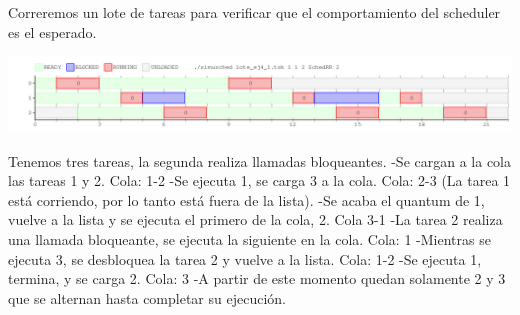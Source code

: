 Correremos un lote de tareas para verificar que el comportamiento del scheduler es el esperado.

\begin{center}
 \includegraphics[scale=0.48]{./RR/RR_simple.png}
\end{center}

Tenemos tres tareas, la segunda realiza llamadas bloqueantes.
-Se cargan a la cola las tareas 1 y 2. Cola: 1-2
-Se ejecuta 1, se carga 3 a la cola. Cola: 2-3 (La tarea 1 está corriendo, por lo tanto está fuera de la lista).
-Se acaba el quantum de 1, vuelve a la lista y se ejecuta el primero de la cola, 2. Cola 3-1
-La tarea 2 realiza una llamada bloqueante, se ejecuta la siguiente en la cola. Cola: 1
-Mientras se ejecuta 3, se desbloquea la tarea 2 y vuelve a la lista. Cola: 1-2
-Se ejecuta 1, termina, y se carga 2. Cola: 3
-A partir de este momento quedan solamente 2 y 3 que se alternan hasta completar su ejecución.


